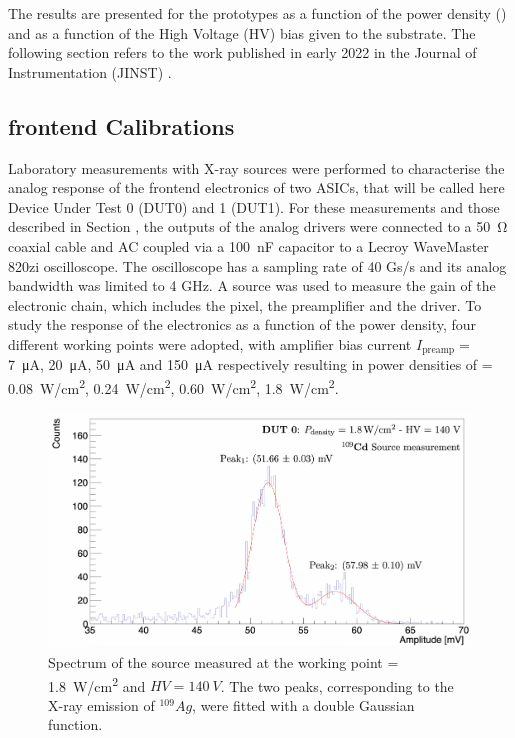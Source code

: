 		The results are presented for the prototypes as a function of the power density (\power) and as a function of the High Voltage (HV) bias  given to the substrate. The following section refers to the work published in early 2022 in the Journal of Instrumentation (JINST) \cite{ATTRACT_proto1_testbeam}. 
		
		\subsection{frontend Calibrations}

		Laboratory measurements with X-ray sources were performed to characterise the analog response of the frontend electronics of two ASICs, that will be called here Device Under Test 0 (DUT0) and 1 (DUT1). For these measurements and those described in Section , the outputs of the analog drivers were connected to a \SI{50}{\ohm} coaxial cable and AC coupled via a \SI{100}{\nano\farad} capacitor to a Lecroy WaveMaster 820zi oscilloscope. The oscilloscope has a sampling rate of 40 Gs/s and its analog bandwidth was limited to 4 GHz. 
		A \Cd source was used to measure the gain of the electronic chain, which includes the pixel, the preamplifier and the driver. To study the response of the electronics as a function of the power density, four different working points were adopted, with  amplifier bias current $I_{\text{preamp}} = $  \SI{7}{\micro\ampere}, \SI{20}{\micro\ampere}, \SI{50}{\micro\ampere} and \SI{150}{\micro\ampere} respectively resulting in power densities of \power = \SI{0.08}{\watt/\centi\meter^2}, \SI{0.24}{\watt/\centi\meter^2}, \SI{0.60}{\watt/\centi\meter^2}, \SI{1.8}{\watt/\centi\meter^2}.
		\begin{figure}[h]
			\centering
			\includegraphics[width=0.88\linewidth]{files/ATTRACT_paper/Cd109_SpectrumAnalysis}
			\caption{Spectrum of the \Cd source measured at the working point \power = \SI{1.8}{\watt/\centi\meter^2} and $HV=140~V$. The two peaks, corresponding to the X-ray emission of $^{109}Ag$,  were fitted with a double Gaussian function.}
			\label{im:ATTRACT_CdSpectrum}
		\end{figure}
		
